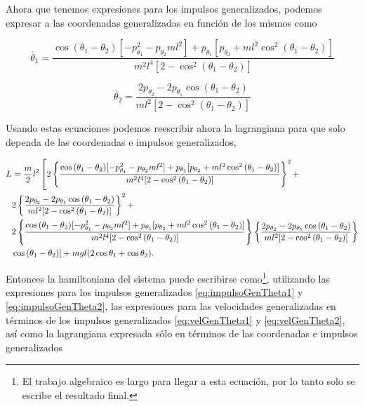 \documentclass[a4paper,10pt]{article}
\numberwithin{equation}{section}
\newcommand{\zerodel}{.\kern-\nulldelimiterspace}
\begin{document}
Ahora que tenemos expresiones para los impulsos generalizados, podemos expresar a las 
coordenadas generalizadas en función de los mismos como

\begin{equation}
 \dot{\theta_1} = \frac{\cos{(\theta_1 - \theta_2)}[- p_{\theta_1}^2 - 
 p_{\theta_2}ml^2] + p_{\theta_1}[p_{\theta_2} + ml^2\cos^2{(\theta_1 - \theta_2)}]}{m^2l^4[2 - \cos^2{(\theta_1 - \theta_2)}]}
 \label{eq:velGenTheta1}
\end{equation}

\begin{equation}
 \dot{\theta_2} = \frac{2p_{\theta_2} - 2p_{\theta_1}\cos{(\theta_1 - \theta_2)}}{ml^2[2 - \cos^2{(\theta_1 - \theta_2)}]}
 \label{eq:velGenTheta2}
\end{equation}

Usando estas ecuaciones podemos reescribir ahora la lagrangiana para que solo dependa 
de las coordenadas e impulsos generalizados, 

\begin{align*}
 L &= \frac{m}{2}l^2\left[2 \left\{ \frac{\cos{(\theta_1 - \theta_2)}[- p_{\theta_1}^2 - 
 p_{\theta_2}ml^2] + p_{\theta_1}[p_{\theta_2} + ml^2\cos^2{(\theta_1 - \theta_2)}]}{m^2l^4[2 
 - \cos^2{(\theta_1 - \theta_2)}]} \right\}^2 + \right\zerodel \\
 &2 \left\{\frac{2p_{\theta_2} - 2p_{\theta_1}\cos{(\theta_1 - 
 \theta_2)}}{ml^2[2 - \cos^2{(\theta_1 - \theta_2)}]} \right\}^2 + \\
 &2\left\{ \frac{\cos{(\theta_1 - \theta_2)}[- p_{\theta_1}^2 - 
 p_{\theta_2}ml^2] + p_{\theta_1}[p_{\theta_2} +
 ml^2\cos^2{(\theta_1 - \theta_2)}]}{m^2l^4[2 - \cos^2{(\theta_1 - \theta_2)}]}\right\}
 \left\{ \frac{2p_{\theta_2} - 2p_{\theta_1}\cos{(\theta_1 - \theta_2)}}{ml^2[2 - \cos^2{(\theta_1 - \theta_2)}]}\right\} \\
 &\left\zerodel\cos{(\theta_1 - \theta_2)}\right] + mgl(2\cos{\theta_1} + \cos{\theta_2}).
\end{align*}

Entonces la hamiltoniana del sistema puede escribirse como\footnote{El trabajo algebraico 
es largo para llegar a esta ecuación, por lo tanto solo se escribe el resultado final.}, 
utilizando las expresiones para los impulsos generalizados \eqref{eq:impulsoGenTheta1} y 
\eqref{eq:impulsoGenTheta2}, las expresiones para las velocidades generalizadas en términos 
de los impulsos generalizados \eqref{eq:velGenTheta1} y \eqref{eq:velGenTheta2}, así 
como la lagrangiana expresada sólo en términos de las coordenadas e impulsos generalizados 
\end{document}
